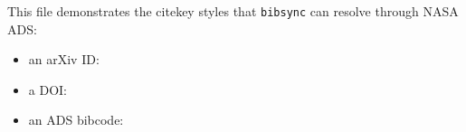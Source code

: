 \documentclass{article}
\begin{document}
This file demonstrates the citekey styles that \texttt{bibsync} can resolve
through NASA ADS:
\begin{itemize}
  \item an arXiv ID: \cite{1602.03837}
  \item a DOI: \cite{10.1103/PhysRevLett.116.061102}
  \item an ADS bibcode: \cite{2016PhRvL.116f1102A}
\end{itemize}



\end{document}
